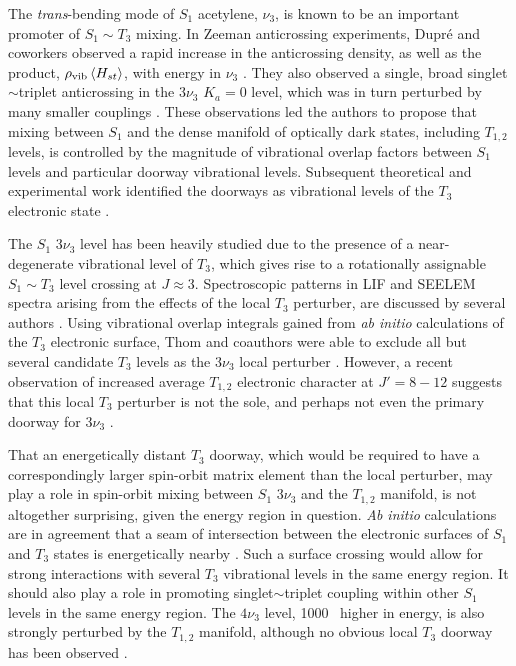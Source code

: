 The \emph{trans}-bending mode of $S_1$ acetylene, $\nu_3$, is known to
be an important promoter of $S_1 \sim T_3$ mixing.  In Zeeman
anticrossing experiments, Dupr\'{e} and coworkers observed a rapid
increase in the anticrossing density, as well as the product,
$\rho_{\text{vib}} \mathinner{\langle{H_{st}}\rangle}$, with energy in $\nu_3$
\cite{dupre91, dupre95b}.  They also observed a single, broad
singlet$\sim$triplet anticrossing in the $3 \nu_3$ $K_a=0$ level,
which was in turn perturbed by many smaller couplings \cite{dupre93}.
These observations led the authors to propose that mixing between
$S_1$ and the dense manifold of optically dark states, including
$T_{1,2}$ levels, is controlled by the magnitude of vibrational
overlap factors between $S_1$ levels and particular doorway
vibrational levels.  Subsequent theoretical and experimental work
identified the doorways as vibrational levels of the $T_3$ electronic
state \cite{vacek96, sherrill96, humphrey97, altunata00}.

The $S_1$ $3 \nu_3$  level has been heavily studied due to the
presence of a near-degenerate vibrational level of $T_3$, which gives
rise to a rotationally assignable $S_1 \sim T_3$ level crossing at $J
\approx 3$.  Spectroscopic patterns in LIF and SEELEM spectra arising
from the effects of the local $T_3$ perturber, are discussed by several
authors \cite{humphrey97, altunata00, altunata01, mishra04}.  Using
vibrational overlap integrals gained from \emph{ab initio}
calculations of the $T_3$ electronic surface, Thom and coauthors were
able to exclude all but several candidate $T_3$ levels as the $3\nu_3$
local perturber \cite{thom07}.
However, a recent observation of increased average $T_{1,2}$
electronic character at $J'=8-12$ suggests that this local $T_3$
perturber is not the sole, and perhaps not even the primary doorway
for $3 \nu_3$  \cite{degroot07}.

That an energetically distant $T_3$ doorway, which would be required
to have a correspondingly larger spin-orbit matrix element than the
local perturber, may play a role in spin-orbit mixing between $S_1$ $3
\nu_3$ and the $T_{1,2}$ manifold, is not altogether surprising, given
the energy region in question.  \emph{Ab initio} calculations are in
agreement that a seam of intersection between the electronic surfaces
of $S_1$ and $T_3$ states is energetically nearby \cite{ventura03,
  thom07}.  Such a surface crossing would allow for strong
interactions with several $T_3$ vibrational levels in the same energy
region.  It should also play a role in promoting singlet$\sim$triplet
coupling within other $S_1$ levels in the same energy region.  The
$4\nu_3$ level, 1000 \rcm\ higher in energy, is also strongly
perturbed by the $T_{1,2}$ manifold, although no obvious local $T_3$
doorway has been observed \cite{drabbels94, ochi91}.

